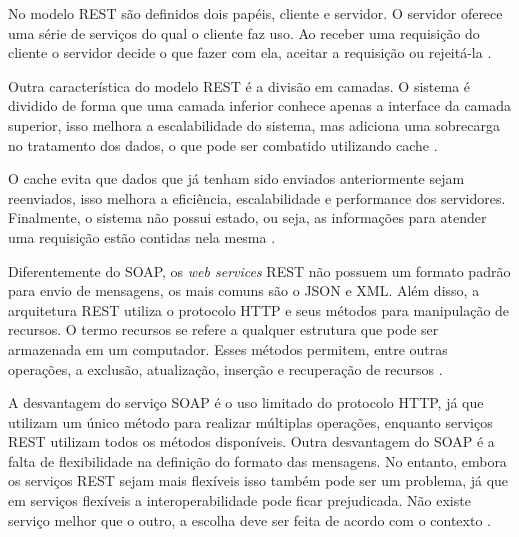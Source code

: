 No modelo REST são definidos dois papéis, cliente e servidor. O servidor oferece uma série 
de serviços do qual o cliente faz uso. Ao receber uma requisição do cliente o servidor decide 
o que fazer com ela, aceitar a requisição ou rejeitá-la \cite{fielding2000architectural}.

Outra característica do modelo REST é a divisão em camadas. O sistema é dividido de forma que 
uma camada inferior conhece apenas a interface da camada superior, isso melhora a 
escalabilidade do sistema, mas adiciona uma sobrecarga no tratamento dos dados, o que pode 
ser combatido utilizando cache \cite{fielding2000architectural}. 

O cache evita que dados que já tenham sido enviados anteriormente sejam reenviados, isso 
melhora a eficiência, escalabilidade e performance dos servidores. Finalmente, o sistema 
não possui estado, ou seja, as informações para atender uma requisição estão contidas nela 
mesma \cite{fielding2000architectural}.

Diferentemente do SOAP, os \textit{web services} REST não possuem um formato padrão para envio 
de mensagens, os mais comuns são o JSON e XML. Além disso, a arquitetura REST utiliza o 
protocolo HTTP e seus métodos para manipulação de recursos. O termo recursos se refere a 
qualquer estrutura que pode ser armazenada em um computador. Esses métodos permitem, entre 
outras operações, a exclusão, atualização, inserção e recuperação de recursos \cite{lima2012}.

A desvantagem do serviço SOAP é o uso limitado do protocolo HTTP, já que utilizam um único 
método para realizar múltiplas operações, enquanto serviços REST utilizam todos os métodos 
disponíveis. Outra desvantagem do SOAP é a falta de flexibilidade na definição do formato 
das mensagens. No entanto, embora os serviços REST sejam mais flexíveis isso também pode ser 
um problema, já que em serviços flexíveis a interoperabilidade pode ficar prejudicada. Não 
existe serviço melhor que o outro, a escolha deve ser feita de acordo com o contexto 
\cite{lima2012}.